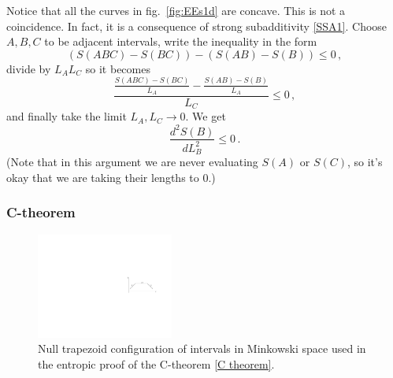 \documentclass[11pt]{article}
\begin{document}
Notice that all the curves in fig.\ \ref{fig:EEs1d} are concave. This is not a coincidence. In fact, it is a consequence of strong subadditivity \eqref{SSA1}. Choose  $A,B,C$ to be adjacent intervals, write the inequality in the form
\begin{equation}
\left(S(ABC)-S(BC)\right)-\left(S(AB)-S(B)\right)\le0\,,
\end{equation}
divide by $L_AL_C$ so it becomes
\begin{equation}
\frac{\frac{S(ABC)-S(BC)}{L_A}-\frac{S(AB)-S(B)}{L_A}}{L_C}\le0\,,
\end{equation}
and finally take the limit $L_A,L_C\to0$. We get
\begin{equation}\label{Sconcave}
\frac{d^2S(B)}{dL^2_B}\le0\,.
\end{equation}
(Note that in this argument we are never evaluating $S(A)$ or $S(C)$, so it's okay that we are taking their lengths to 0.)


\subsubsection{C-theorem}

\begin{figure}[tbp]
\centering
\includegraphics[width=0.4\textwidth]{figs/trapezoid}
\caption{\label{fig:trapezoid}
Null trapezoid configuration of intervals in Minkowski space used in the entropic proof of the C-theorem \eqref{C theorem}.}
\end{figure}
\end{document}
